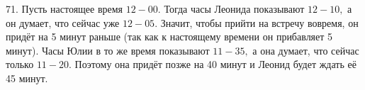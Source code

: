 71. Пусть настоящее время $12-00.$ Тогда часы Леонида показывают $12-10,$ а он думает, что сейчас уже $12-05.$ Значит, чтобы прийти на встречу вовремя, он придёт на 5 минут раньше (так как к настоящему времени он прибавляет 5 минут). Часы Юлии в то же время показывают $11-35,$ а она думает, что сейчас только $11-20.$ Поэтому она придёт позже на 40 минут и Леонид будет ждать её 45 минут.\\
